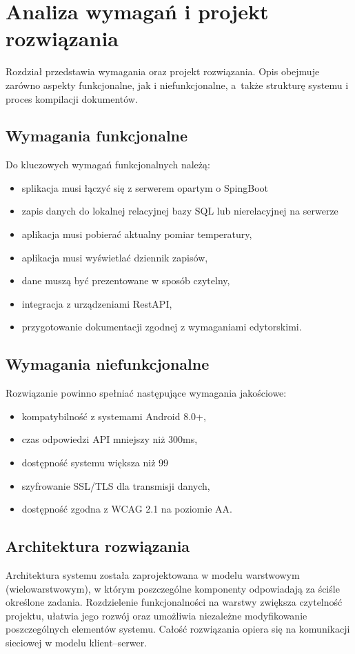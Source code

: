 \chapter{Analiza wymagań i projekt rozwiązania}
Rozdział przedstawia wymagania oraz projekt rozwiązania. Opis obejmuje zarówno aspekty funkcjonalne,
jak i niefunkcjonalne, a~także strukturę systemu i proces kompilacji dokumentów.

\section{Wymagania funkcjonalne}
Do kluczowych wymagań funkcjonalnych należą:
\begin{itemize}
    \item splikacja musi łączyć się z serwerem opartym o SpingBoot
    \item zapis danych do lokalnej relacyjnej bazy SQL lub nierelacyjnej na serwerze
    \item aplikacja musi pobierać aktualny pomiar temperatury,
    \item aplikacja musi wyświetlać dziennik zapisów,
    \item dane muszą być prezentowane w sposób czytelny,
    \item integracja z urządzeniami RestAPI,
    \item przygotowanie dokumentacji zgodnej z wymaganiami edytorskimi.
\end{itemize}

\section{Wymagania niefunkcjonalne}
Rozwiązanie powinno spełniać następujące wymagania jakościowe:
\begin{itemize}
    \item kompatybilność z systemami Android 8.0+,
    \item czas odpowiedzi API mniejszy niż 300ms,
    \item dostępność systemu większa niż 99%
    \item szyfrowanie SSL/TLS dla transmisji danych,
    \item dostępność zgodna z WCAG 2.1 na poziomie AA.
\end{itemize}

\section{Architektura rozwiązania}
Architektura systemu została zaprojektowana w modelu warstwowym (wielowarstwowym), w którym poszczególne komponenty odpowiadają za ściśle określone zadania. Rozdzielenie funkcjonalności na warstwy zwiększa czytelność projektu, ułatwia jego rozwój oraz umożliwia niezależne modyfikowanie poszczególnych elementów systemu. Całość rozwiązania opiera się na komunikacji sieciowej w modelu klient–serwer.

